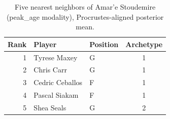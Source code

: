 \begin{table}[htbp]
  \centering\small
  \begin{tabular}{rllc}
    \toprule
    Rank & Player & Position & Archetype \\
    \midrule
    1 & Tyrese Maxey & G & 1 \\
    2 & Chris Carr & G & 1 \\
    3 & Cedric Ceballos & F & 1 \\
    4 & Pascal Siakam & F & 1 \\
    5 & Shea Seals & G & 2 \\
    \bottomrule
  \end{tabular}
  \caption{Five nearest neighbors of Amar'e Stoudemire (peak_age modality), Procrustes-aligned posterior mean.}
  \label{tab:Amar_e_Stoudemire_neighbors_peak_age}
\end{table}

